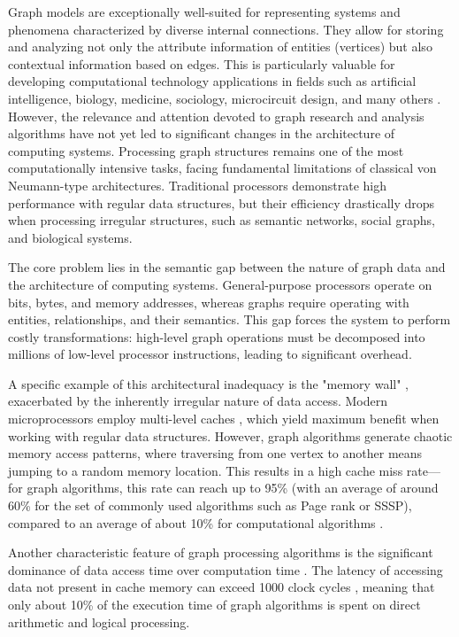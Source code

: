 Graph models are exceptionally well-suited for representing systems and phenomena characterized by diverse internal connections. They allow for storing and analyzing not only the attribute information of entities (vertices) but also contextual information based on edges. This is particularly valuable for developing computational technology applications in fields such as artificial intelligence, biology, medicine, sociology, microcircuit design, and many others \cite{MajeedRaufGraphTheory2020}. However, the relevance and attention devoted to graph research and analysis algorithms have not yet led to significant changes in the architecture of computing systems. Processing graph structures remains one of the most computationally intensive tasks, facing fundamental limitations of classical von Neumann-type architectures. Traditional processors demonstrate high performance with regular data structures, but their efficiency drastically drops when processing irregular structures, such as semantic networks, social graphs, and biological systems.

The core problem lies in the semantic gap between the nature of graph data and the architecture of computing systems. General-purpose processors operate on bits, bytes, and memory addresses, whereas graphs require operating with entities, relationships, and their semantics. This gap forces the system to perform costly transformations: high-level graph operations must be decomposed into millions of low-level processor instructions, leading to significant overhead.

A specific example of this architectural inadequacy is the "memory wall" \cite{WangAcomprehensive2016}, exacerbated by the inherently irregular nature of data access. Modern microprocessors employ multi-level caches \cite{XuGraphprocessingonGPU2014}, which yield maximum benefit when working with regular data structures. However, graph algorithms generate chaotic memory access patterns, where traversing from one vertex to another means jumping to a random memory location. This results in a high cache miss rate—for graph algorithms, this rate can reach up to 95\% (with an average of around 60\% for the set of commonly used algorithms such as Page rank or SSSP), compared to an average of about 10\% for computational algorithms \cite{XuGraphprocessingonGPU2014}.

Another characteristic feature of graph processing algorithms is the significant dominance of data access time over computation time \cite{popovImplementationFordFulkersonAlgorithm2014,popovStudyKruskalPrim2014,IbrahimAnalysisx862010}. The latency of accessing data not present in cache memory can exceed 1000 clock cycles \cite{QianWeiXiangXiaoAPerformance2021}, meaning that only about 10\% of the execution time of graph algorithms is spent on direct arithmetic and logical processing.

